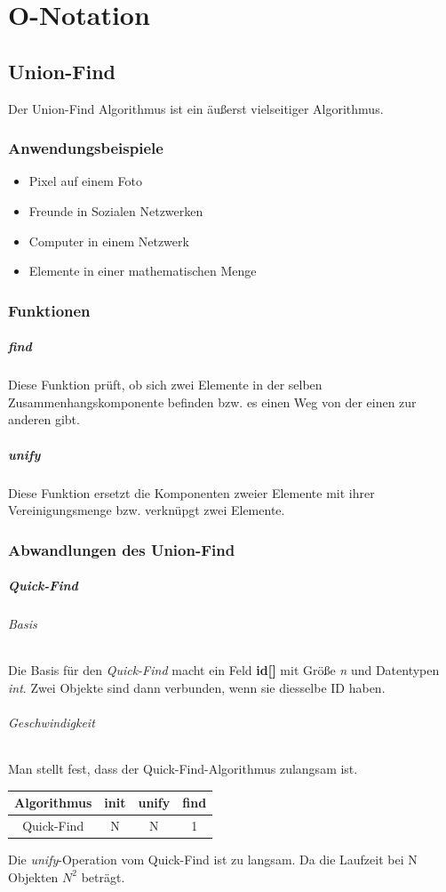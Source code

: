 \documentclass{book}
\begin{document}
\chapter{O-Notation}
\section{Union-Find}
Der Union-Find Algorithmus ist ein äußerst vielseitiger Algorithmus.
\subsection{Anwendungsbeispiele}
\begin{itemize}
	\item Pixel auf einem Foto
	\item Freunde in Sozialen Netzwerken
	\item Computer in einem Netzwerk
	\item Elemente in einer mathematischen Menge
\end{itemize}
\subsection{Funktionen}
\paragraph{find} Diese Funktion prüft, ob sich zwei Elemente in der selben Zusammenhangskomponente befinden bzw. es einen Weg von der einen zur anderen gibt.
\paragraph{unify} Diese Funktion ersetzt die Komponenten zweier Elemente mit ihrer Vereinigungsmenge bzw. verknüpgt zwei Elemente.
\subsection{Abwandlungen des Union-Find}
\paragraph{Quick-Find}
\subparagraph*{Basis} Die Basis für den \textit{Quick-Find} macht ein Feld \textbf{id[]} mit Größe \textit{n} und Datentypen \textit{int}. Zwei Objekte sind dann verbunden, wenn sie diesselbe ID haben.
\subparagraph*{Geschwindigkeit} Man stellt fest, dass der Quick-Find-Algorithmus zulangsam ist.
\newline
\begin{center}
\begin{tabular}{|c|c|c|c|}
	\hline
	\textbf{Algorithmus} & \textbf{init} & \textbf{unify} & \textbf{find}  \\
	\hline
	Quick-Find & N & N & 1 \\
	\hline
\end{tabular}
\end{center}
Die \textit{unify}-Operation vom Quick-Find ist zu langsam. Da die Laufzeit bei N Objekten \textbf{$N^{2}$} beträgt.
\end{document}
